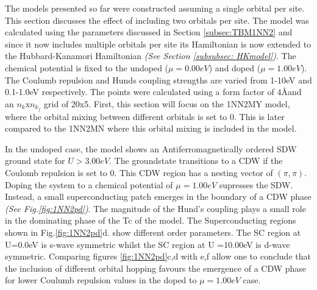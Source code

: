 \documentclass[12pt]{article}
\begin{document}
The models presented so far were constructed assuming a single orbital per site. This section discusses the effect of including
two orbitals per site. The model was calculated using the parameters discussed in Section \ref{subsec:TBM1NN2} and since it now includes
multiple orbitals per site its Hamiltonian is now extended to the Hubbard-Kanamori Hamiltonian \textit{(See Section \ref{subsubsec: HKmodel})}. 
The chemical potential is fixed to the undoped ($\mu = 0.00eV $) and doped ($\mu =1.00eV$). The Coulumb repulsion and Hunds coupling strengths are varied from 1-10eV and 0.1-1.0eV respectively.
The points were calculated using a form factor of 4\AA and an $n_k$x$n_{k_f}$ grid of 20x5. 
First, this section will focus on the 1NN2MY model, where the orbital mixing between different orbitals is set to 0. This is later compared
to the 1NN2MN where this orbital mixing is included in the model. \par
\medskip
\noindent In the undoped case, the model shows an Antiferromagnetically ordered SDW ground state
for $U > 3.00eV$. The groundstate transitions to a CDW if the Coulomb repulsion is set to 0. This CDW region has a nesting vector 
of $(\pi, \pi)$. Doping the system to a chemical potential of $\mu = 1.00eV$ supresses the SDW. Instead, a small superconducting patch 
emerges in the boundary of a CDW phase \textit{(See Fig.{\ref{fig:1NN2pd}})}. The magnitude of the Hund's coupling plays a small role in the dominating phase of the Tc of the model. The Superconducting regions shown in Fig.\ref{fig:1NN2pd}d. show different order parameters. The SC region at U=0.0eV is s-wave symmetric whilst the SC region at U =10.00eV
is d-wave symmetric. Comparing figures \ref{fig:1NN2pd}c,d with e,f allow one to conclude that the inclusion of
different orbital hopping favours the emergence of a CDW phase for lower Coulumb repulsion values in the doped to $\mu = 1.00eV$ case. 
\end{document}
